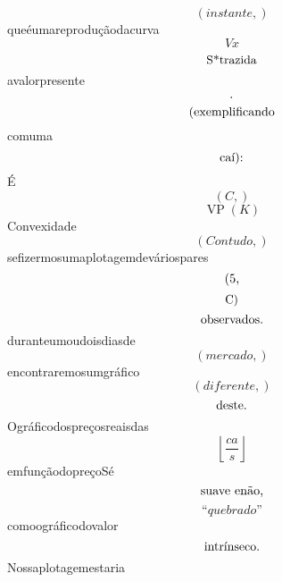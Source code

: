 \documentclass{article}
\begin{document}
\begin{equation}
\left( instante,\right)
\end{equation}queéumareproduçãodacurva\begin{equation}
V x
\end{equation}\begin{equation}
$S*trazida$
\end{equation}avalorpresente\begin{equation}
$.$
\end{equation}\begin{equation}
$(exemplificando$
\end{equation}comuma\begin{equation}
$caí):$
\end{equation}É\begin{equation}
\left( C,\right)
\end{equation}\begin{equation}
\operatorname{VP}{\left(K \right)}
\end{equation}Convexidade\begin{equation}
\left( Contudo,\right)
\end{equation}sefizermosumaplotagemdeváriospares\begin{equation}
$(5,$
\end{equation}\begin{equation}
$C)$
\end{equation}\begin{equation}
$observados.$
\end{equation}duranteumoudoisdiasde\begin{equation}
\left( mercado,\right)
\end{equation}encontraremosumgráfico\begin{equation}
\left( diferente,\right)
\end{equation}\begin{equation}
$deste.$
\end{equation}Ográficodospreçosreaisdas\begin{equation}
\left\lfloor{\frac{ca}{s}}\right\rfloor
\end{equation}emfunçãodopreçoSé\begin{equation}
$suave enão,$
\end{equation}\begin{equation}
“quebrado”
\end{equation}comoográficodovalor\begin{equation}
$intrínseco.$
\end{equation}Nossaplotagemestaria\begin{equation}

\end{equation}
\end{document}
